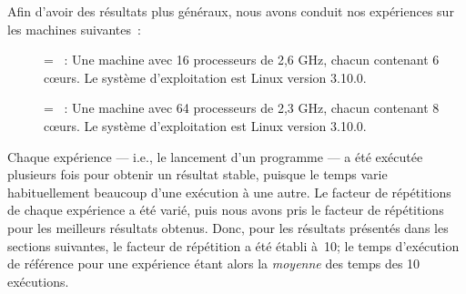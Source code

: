 \goodbreak
\begin{samepage}
Afin d'avoir des r\'esultats plus g\'en\'eraux, nous avons conduit nos exp\'eriences sur les machines suivantes~:
\label{machines.sect}



\begin{description}
\item[] = ~: Une machine avec 16 processeurs de 2,6 GHz, chacun contenant 6 cœurs. Le syst\`eme d'exploitation est Linux version 3.10.0. 


\item[] = ~:  Une machine avec 64 processeurs de 2,3 GHz, chacun contenant 8 cœurs. Le système d'exploitation est Linux version 3.10.0.


\end{description}
\end{samepage}




Chaque exp\'erience --- i.e., le lancement d'un programme --- a \'et\'e ex\'ecut\'ee plusieurs fois pour obtenir un r\'esultat stable, puisque le temps varie habituellement beaucoup d'une ex\'ecution \`a une autre. Le facteur de r\'ep\'etitions de chaque exp\'erience a \'et\'e vari\'e, puis nous avons pris le facteur de r\'ep\'etitions pour les meilleurs r\'esultats obtenus.
%
Donc, pour les r\'esultats pr\'esent\'es dans les sections suivantes, le facteur de r\'ep\'etition a \'et\'e \'etabli \`a~10; le temps d'ex\'ecution de r\'ef\'erence pour une exp\'erience \'etant alors la \emph{moyenne} des temps des 10 ex\'ecutions.



